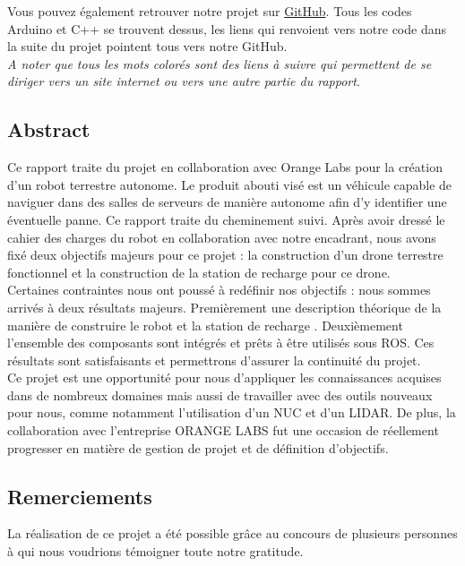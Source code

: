 \documentclass[french]{rapportENSTAB}
\begin{document}
Vous pouvez également retrouver notre projet sur \href{https://github.com/AntoninLize/Projet_OrangeLabs}{GitHub}. Tous les codes Arduino et C++ se trouvent dessus, les liens qui renvoient vers notre code dans la suite du projet pointent tous vers notre GitHub. \\

\textit{A noter que tous les mots colorés sont des liens à suivre qui permettent de se diriger vers un site internet ou vers une autre partie du rapport}.
\\


\subsection{Abstract}

Ce rapport traite du projet en collaboration avec Orange Labs pour la création d’un robot terrestre  autonome. Le produit abouti visé est un véhicule capable de naviguer dans des salles de serveurs de manière autonome afin d’y identifier une éventuelle panne. Ce rapport traite du cheminement suivi. 
Après avoir dressé le cahier des charges du robot en collaboration avec notre encadrant, nous avons fixé deux objectifs majeurs pour ce projet : la construction d’un drone terrestre fonctionnel et la construction de la station de recharge pour ce drone. \\

Certaines contraintes nous ont poussé à redéfinir nos objectifs : nous sommes arrivés à deux résultats majeurs. Premièrement  une description théorique de la manière de construire le robot et la station de recharge . Deuxièmement l’ensemble des composants sont intégrés et prêts à être utilisés sous ROS. Ces résultats sont satisfaisants et permettrons d’assurer la continuité du projet. \\

Ce projet est une opportunité pour nous d’appliquer les connaissances acquises dans de nombreux domaines mais aussi de travailler avec des outils nouveaux pour nous, comme notamment l’utilisation d’un NUC et d’un LIDAR. De plus, la collaboration avec l’entreprise ORANGE LABS fut une occasion de réellement progresser en matière de gestion de projet et de définition d’objectifs.
\\

\subsection{Remerciements}
La réalisation de ce projet a été possible grâce au concours de plusieurs personnes à qui nous voudrions témoigner toute notre gratitude.\\ 
\end{document}
